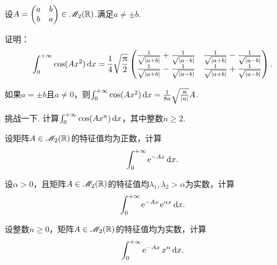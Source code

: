 \begin{mybox}
  \begin{problem}[别忘了Frenel.]

    设$A=\begin{pmatrix}
      a & b \\
      b & a
    \end{pmatrix}\in\mathscr M_2(\mathbb R)$.满足$a\ne \pm b$.
    \begin{enum}
      \item 证明：
      \[
        \int_0^{+\infty}\cos(Ax^2) \mathop{}\!\mathrm d x = \frac14\sqrt{\frac{\uppi}2}
        \begin{pmatrix}
          \frac1{\sqrt{|a+b|}} + \frac1{\sqrt{|a-b|}} & \frac1{\sqrt{|a+b|}} - \frac1{\sqrt{|a-b|}} \\
          \frac1{\sqrt{|a+b|}} - \frac1{\sqrt{|a-b|}} & \frac1{\sqrt{|a+b|}} + \frac1{\sqrt{|a-b|}}
        \end{pmatrix}.
      \]
      \item 如果$a=\pm b$且$a\ne 0$，则$\int_0^{+\infty}\cos(Ax^2)\mathop{}\!\mathrm d x=\frac1{8a}\sqrt{\frac{\uppi}{|a|}}A$.

      {\kaishu 挑战一下.} 计算$\int_0^{+\infty}\cos(Ax^n)\mathop{}\!\mathrm d x$，其中整数$n\ge2$.
    \end{enum}
  \end{problem}
\end{mybox}

\begin{mybox}
  \begin{problem}[指数矩阵积分.]
    \begin{enum}
      \item\label{prob4.97a} 设矩阵$A\in\mathscr M_2(\mathbb R)$的特征值均为正数，计算
          \[
            \int_0^{+\infty}\operatorname{\!\!\;\mathrm e}^{-Ax} \mathop{}\!\mathrm d x.
          \]
      \item\label{prob4.97b} 设$\alpha>0$，且矩阵$A\in\mathscr M_2(\mathbb R)$的特征值均$\lambda_1,\lambda_2>\alpha$为实数，计算
          \[
            \int_0^{+\infty} \operatorname{\!\!\;\mathrm e}^{-Ax}\operatorname{\!\!\;\mathrm e}^{\alpha x}\mathop{}\!\mathrm d x.
          \]
      \item\label{prob4.97c} 设整数$n\ge0$，矩阵$A\in\mathscr M_2(\mathbb R)$的特征值均为实数，计算
          \[
            \int_0^{+\infty}\operatorname{\!\!\;\mathrm e}^{-Ax}x^n \mathop{}\!\mathrm d x.
          \]
    \end{enum}
  \end{problem}
\end{mybox}

